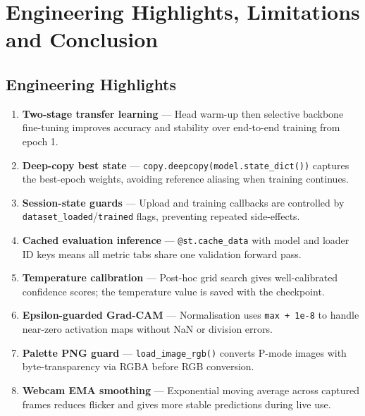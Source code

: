 \documentclass[12pt,a4paper]{article}
\begin{document}
\section{Engineering Highlights, Limitations and Conclusion}

\subsection{Engineering Highlights}
\begin{enumerate}[leftmargin=1.5em, label=\textbf{E\arabic*.}, itemsep=1pt]
  \item \textbf{Two-stage transfer learning} — Head warm-up then selective backbone
    fine-tuning improves accuracy and stability over end-to-end training from epoch 1.
  \item \textbf{Deep-copy best state} — \texttt{copy.deepcopy(model.state\_dict())}
    captures the best-epoch weights, avoiding reference aliasing when training continues.
  \item \textbf{Session-state guards} — Upload and training callbacks are controlled by
    \texttt{dataset\_loaded}/\texttt{trained} flags, preventing repeated side-effects.
  \item \textbf{Cached evaluation inference} — \texttt{@st.cache\_data} with model and
    loader ID keys means all metric tabs share one validation forward pass.
  \item \textbf{Temperature calibration} — Post-hoc grid search gives well-calibrated
    confidence scores; the temperature value is saved with the checkpoint.
  \item \textbf{Epsilon-guarded Grad-CAM} — Normalisation uses \texttt{max + 1e-8}
    to handle near-zero activation maps without NaN or division errors.
  \item \textbf{Palette PNG guard} — \texttt{load\_image\_rgb()} converts P-mode images
    with byte-transparency via RGBA before RGB conversion.
  \item \textbf{Webcam EMA smoothing} — Exponential moving average across captured frames
    reduces flicker and gives more stable predictions during live use.
\end{enumerate}
\end{document}
